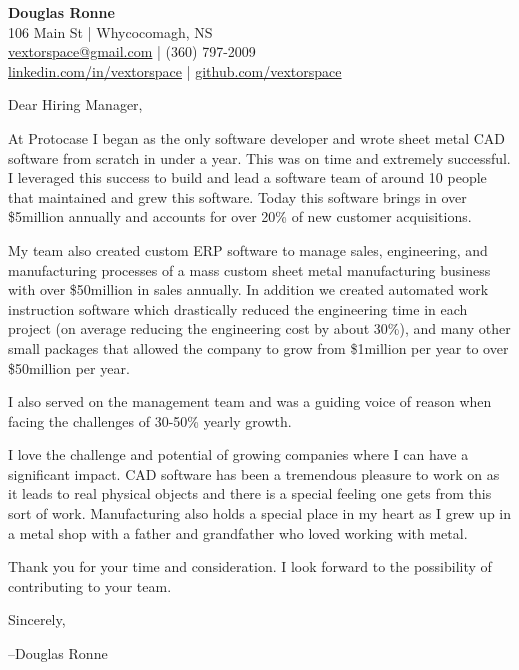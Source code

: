 \documentclass[letter,12pt]{article}
\begin{document}
\begin{center}
    {\Huge \textbf{Douglas Ronne}}\\
    \vspace{2mm}
    106 Main St | Whycocomagh, NS\\
    \href{mailto:vextorspace@gmail.com}{vextorspace@gmail.com} | (360) 797-2009\\
    \href{www.linkedin.com/in/douglas-ronne-7133272a}{linkedin.com/in/vextorspace} | \href{https://github.com/vextorspace}{github.com/vextorspace}
\end{center}

Dear Hiring Manager,

\vspace{.5cm}
\noindent
At Protocase I began as the only software developer and wrote sheet metal CAD software from scratch in under a year. This was on time and extremely successful. I leveraged this success to build and lead a software team of around 10 people that maintained and grew this software. Today this software brings in over \$5million annually and accounts for over 20\% of new customer acquisitions.

\vspace{.5cm}
\noindent
My team also created custom ERP software to manage sales, engineering, and manufacturing processes of a  mass custom sheet metal manufacturing business with over \$50million in sales annually. In addition we created automated work instruction software which drastically reduced the engineering time in each project (on average reducing the engineering cost by about 30\%), and many other small packages that allowed the company to grow from \$1million per year to over \$50million per year.

\vspace{.5cm}
\noindent
I also served on the management team and was a guiding voice of reason when facing the challenges of 30-50\% yearly growth.

\vspace{.5cm}
\noindent
I love the challenge and potential of growing companies where I can have a significant impact. CAD software has been a tremendous pleasure to work on as it leads to real physical objects and there is a special feeling one gets from this sort of work. Manufacturing also holds a special place in my heart as I grew up in a metal shop with a father and grandfather who loved working with metal.

\vspace{.5cm}
\noindent
Thank you for your time and consideration. I look forward to the possibility of contributing to your team.

\vspace{1cm}
\noindent
Sincerely,

\noindent
--Douglas Ronne
\end{document}
